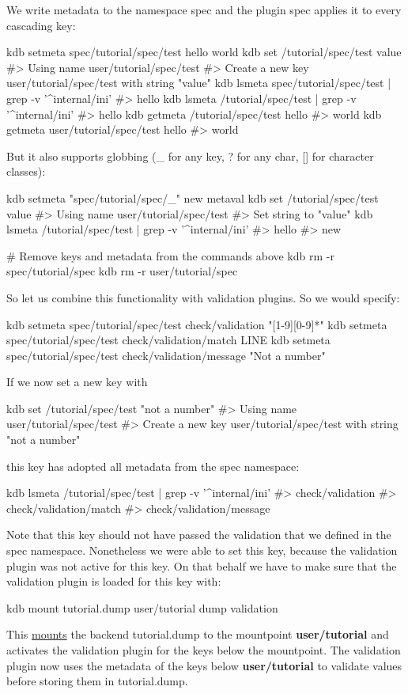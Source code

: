 We write metadata to the namespace {\ttfamily spec} and the plugin {\ttfamily spec} applies it to every cascading key\+:


\begin{DoxyCode}
kdb setmeta spec/tutorial/spec/test hello world
kdb set /tutorial/spec/test value
#> Using name user/tutorial/spec/test
#> Create a new key user/tutorial/spec/test with string "value"
kdb lsmeta spec/tutorial/spec/test | grep -v '^internal/ini'
#> hello
kdb lsmeta /tutorial/spec/test | grep -v '^internal/ini'
#> hello
kdb getmeta /tutorial/spec/test hello
#> world
kdb getmeta user/tutorial/spec/test hello
#> world
\end{DoxyCode}


But it also supports globbing ({\ttfamily \+\_\+} for any key, {\ttfamily ?} for any char, {\ttfamily \mbox{[}\mbox{]}} for character classes)\+:


\begin{DoxyCode}
kdb setmeta "spec/tutorial/spec/\_" new metaval
kdb set /tutorial/spec/test value
#> Using name user/tutorial/spec/test
#> Set string to "value"
kdb lsmeta /tutorial/spec/test | grep -v '^internal/ini'
#> hello
#> new

# Remove keys and metadata from the commands above
kdb rm -r spec/tutorial/spec
kdb rm -r user/tutorial/spec
\end{DoxyCode}


So let us combine this functionality with validation plugins. So we would specify\+:


\begin{DoxyCode}
kdb setmeta spec/tutorial/spec/test check/validation "[1-9][0-9]*"
kdb setmeta spec/tutorial/spec/test check/validation/match LINE
kdb setmeta spec/tutorial/spec/test check/validation/message "Not a number"
\end{DoxyCode}


If we now set a new key with 
\begin{DoxyCode}
kdb set /tutorial/spec/test "not a number"
#> Using name user/tutorial/spec/test
#> Create a new key user/tutorial/spec/test with string "not a number"
\end{DoxyCode}
 this key has adopted all metadata from the spec namespace\+: 
\begin{DoxyCode}
kdb lsmeta /tutorial/spec/test | grep -v '^internal/ini'
#> check/validation
#> check/validation/match
#> check/validation/message
\end{DoxyCode}
 Note that this key should not have passed the validation that we defined in the spec namespace. Nonetheless we were able to set this key, because the validation plugin was not active for this key. On that behalf we have to make sure that the validation plugin is loaded for this key with\+: 
\begin{DoxyCode}
kdb mount tutorial.dump user/tutorial dump validation
\end{DoxyCode}
 This \hyperlink{doc_tutorials_mount_md}{mounts} the backend {\ttfamily tutorial.\+dump} to the mountpoint {\bfseries user/tutorial} and activates the validation plugin for the keys below the mountpoint. The validation plugin now uses the metadata of the keys below {\bfseries user/tutorial} to validate values before storing them in {\ttfamily tutorial.\+dump}.

